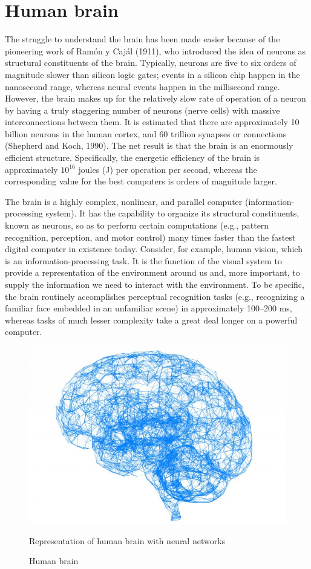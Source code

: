 \documentclass[12pt]{article}
\begin{document}
\section{\fontsize{14}{14}\selectfont Human brain}
\par The struggle to understand the brain has been made easier because of the pioneering work of Ramón y Cajál (1911), who introduced the idea of neurons as structural constituents of the brain. Typically, neurons are five to six orders of magnitude slower than silicon logic gates; events in a silicon chip happen in the nanosecond range, whereas neural events happen in the millisecond range. However, the brain makes up for the relatively slow rate of operation of a neuron by having a truly staggering number of neurons (nerve cells) with massive interconnections between them. It is estimated that there are approximately 10 billion neurons in the human cortex, and 60 trillion synapses or connections (Shepherd and Koch, 1990). The net result is that the brain is an enormously efficient structure. Specifically, the energetic efficiency
of the brain is approximately $10^{16}$ joules (J) per operation per second, whereas the corresponding value for the best computers is orders of magnitude larger. 

The brain is a highly complex, nonlinear, and parallel computer
(information-processing system). It has the capability to organize its structural constituents, known as neurons, so as to perform certain computations (e.g., pattern recognition, perception, and motor control) many times faster than the fastest digital computer in existence today. Consider, for example, human vision, which is an information-processing task. It is the function of the visual system to provide a representation of the environment around us and, more important, to supply the information we need to interact with the environment. To be specific, the brain routinely accomplishes perceptual recognition tasks (e.g., recognizing a familiar face embedded in an unfamiliar scene) in approximately 100–200 ms, whereas tasks of much lesser complexity take a great deal longer on a powerful computer.


\begin{figure}[h]
    \centering
    \includegraphics[width=0.25 \textwidth]{brain.jpg}
    \caption{Human brain}
    \label{fig:mesh1}
    Representation of human brain with neural networks 
\end{figure}
\end{document}
